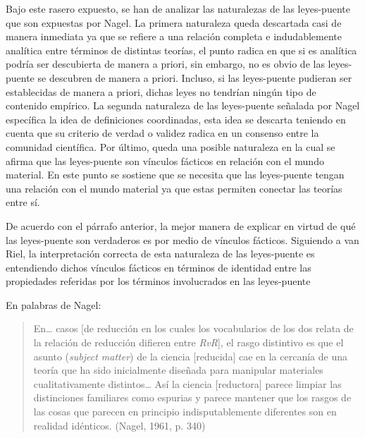 \documentclass[]{book}
\begin{document}
Bajo este rasero expuesto, se han de analizar las naturalezas de las
leyes-puente que son expuestas por Nagel. La primera naturaleza queda
descartada casi de manera inmediata ya que se refiere a una relación
completa e indudablemente analítica entre términos de distintas teorías,
el punto radica en que si es analítica podría ser descubierta de manera
a priori, sin embargo, no es obvio de las leyes-puente se descubren de
manera a priori. Incluso, si las leyes-puente pudieran ser establecidas
de manera a priori, dichas leyes no tendrían ningún tipo de contenido
empírico. La segunda naturaleza de las leyes-puente señalada por Nagel
específica la idea de definiciones coordinadas, esta idea se descarta
teniendo en cuenta que su criterio de verdad o validez radica en un
consenso entre la comunidad científica. Por último, queda una posible
naturaleza en la cual se afirma que las leyes-puente son vínculos
fácticos en relación con el mundo material. En este punto se sostiene
que se necesita que las leyes-puente tengan una relación con el mundo
material ya que estas permiten conectar las teorías entre sí.

De acuerdo con el párrafo anterior, la mejor manera de explicar en
virtud de qué las leyes-puente son verdaderos es por medio de vínculos
fácticos. Siguiendo a van Riel, la interpretación correcta de esta
naturaleza de las leyes-puente es entendiendo dichos vínculos fácticos
en términos de identidad entre las propiedades referidas por los
términos involucrados en las leyes-puente

En palabras de Nagel:

\begin{quote}
En\ldots{} casos {[}de reducción en los cuales los vocabularios de los
dos relata de la relación de reducción difieren entre \emph{RvR}{]}, el
rasgo distintivo es que el asunto (\emph{subject matter}) de la ciencia
{[}reducida{]} cae en la cercanía de una teoría que ha sido inicialmente
diseñada para manipular materiales cualitativamente distintos\ldots{}
Así la ciencia {[}reductora{]} parece limpiar las distinciones
familiares como espurias y parece mantener que los rasgos de las cosas
que parecen en principio indisputablemente diferentes son en realidad
idénticos. (Nagel, 1961, p. 340)
\end{quote}
\end{document}

